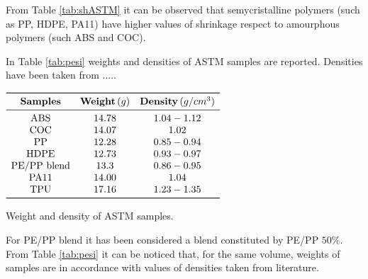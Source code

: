 \documentclass[a4paper, 11pt]{article}
\begin{document}
From Table \ref{tab:shASTM} it can be observed that semycristalline polymers (such as PP, HDPE, PA11) have higher values of shrinkage respect to amourphous polymers (such ABS and COC).

In Table \ref{tab:pesi} weights and densities of ASTM samples are reported. Densities have been taken from .....

\begin{table}[htp]
\centering
$
\begin{array}{ccc}
\toprule
\textbf{Samples} & \textbf{Weight}\,(g) & \textbf{Density}\,(g/cm^3) \\
\midrule
\text{ABS} & 14.78 & 1.04-1.12  \\
\text{COC} & 14.07 & 1.02 \\
\text{PP} & 12.28 & 0.85-0.94 \\
\text{HDPE} & 12.73 & 0.93-0.97 \\
\text{PE/PP blend} & 13.3 & 0.86-0.95 \\
\text{PA11} & 14.00 & 1.04 \\
\text{TPU} & 17.16 & 1.23-1.35 \\
\bottomrule
\end{array}
$
\caption{Weight and density of ASTM samples.}
\label{tab:pesi}
\end{table}

For PE/PP blend it has been considered a blend constituted by PE/PP $50\%$. From Table \ref{tab:pesi} it can be noticed that, for the same volume, weights of samples are in accordance with values of densities taken from literature. 
\end{document}
